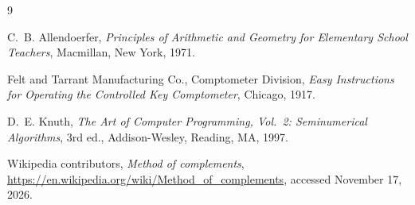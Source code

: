 \documentclass[11pt]{amsart}
\theoremstyle{definition}
\theoremstyle{remark}
\begin{document}
\begin{thebibliography}{9}

C.~B. Allendoerfer,
\emph{Principles of Arithmetic and Geometry for Elementary School Teachers},
Macmillan, New York, 1971.

Felt and Tarrant Manufacturing Co., Comptometer Division,
\emph{Easy Instructions for Operating the Controlled Key Comptometer},
Chicago, 1917.

D.~E. Knuth,
\emph{The Art of Computer Programming, Vol.~2: Seminumerical Algorithms},
3rd ed., Addison-Wesley, Reading, MA, 1997.

Wikipedia contributors,
\emph{Method of complements},
\url{https://en.wikipedia.org/wiki/Method_of_complements},
accessed November 17, 2026.

\end{thebibliography}
\end{document}

